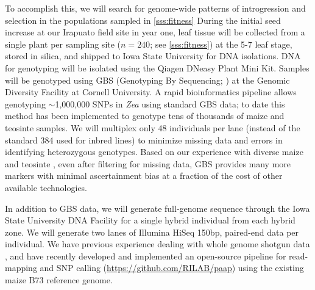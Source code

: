 To accomplish this, we will search for genome-wide patterns of introgression and selection in the populations sampled in \ref{sss:fitness}
During the initial seed increase at our Irapuato field site in year one, leaf tissue will be collected from a single plant per sampling site ($n=240$; see \ref{sss:fitness}) at the 5-7 leaf stage, stored in silica, and shipped to Iowa State University for DNA isolations.
DNA for genotyping will be isolated using the Qiagen DNeasy Plant Mini Kit.
Samples will be genotyped using GBS (Genotyping By Sequencing; \citealt{Elshire2011}) at the Genomic Diversity Facility at Cornell University.
A rapid bioinformatics pipeline \citep[TASSLE-GBS; ][]{Glaubitz2014} allows genotyping $\sim$1,000,000 SNPs in \emph{Zea}  using standard GBS data; to date this method has been implemented to genotype tens of thousands of maize and teosinte samples.
We will multiplex only 48 individuals per lane (instead of the standard 384 used for inbred lines) to minimize missing data and errors in identifying heterozygous genotypes. 
Based on our experience with diverse maize and teosinte \citep[\emph{e.g.,}][]{Takuno15062015, mezmouk2014pattern}, even after filtering for missing data, GBS provides many more markers with minimal ascertainment bias at a fraction of the cost of other available technologies. 

In addition to GBS data, we will generate full-genome sequence through the Iowa State University DNA Facility for a single hybrid individual from each hybrid zone.  
We will generate two lanes of Illumina HiSeq 150bp, paired-end data per individual. 
We have previous experience dealing with whole genome shotgun data \citep{Gore2009, Chia2012a,  Hufford2012b, da2015origin}, and have recently developed and implemented an open-source pipeline for read-mapping and SNP calling (\url{https://github.com/RILAB/paap}) using the existing maize B73 reference genome. 
 
